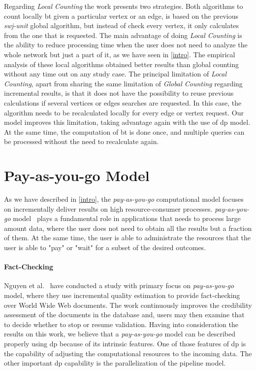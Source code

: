 Regarding \emph{Local Counting} the work presents two strategies. 
Both algorithms to count locally \acrshort{bt} given a particular vertex or an edge, is based on the previous \emph{swj-unit} global algorithm, but instead of check every vertex, it only calculates from the one that is requested. 
The main advantage of doing \emph{Local Counting} is the ability to reduce processing time when the user does not need to analyze the whole network but just a part of it, as we have seen in \autoref{intro}.
The empirical analysis of these local algorithms obtained better results than global counting without any time out on any study case.
The principal limitation of \emph{Local Counting}, apart from sharing the same limitation of \emph{Global Counting} regarding incremental results, is that it does not have the possibility to reuse previous calculations if several vertices or edges searches are requested. 
In this case, the algorithm needs to be recalculated locally for every edge or vertex request.
Our model improves this limitation, taking advantage again with the use of \acrshort{dp} model. At the same time, the computation of \acrshort{bt} is done once, and multiple queries can be processed without the need to recalculate again.

\section{Pay-as-you-go Model}
As we have described in \autoref{intro}, the \emph{pay-as-you-go} computational model focuses on incrementally deliver results on high resource-consumer processes.
\emph{pay-as-you-go} model~\cite{factcatch} plays a fundamental role in applications that needs to process large amount data, where the user does not need to obtain all the results but a fraction of them.
At the same time, the user is able to administrate the resources that the user is able to "pay" or "wait" for a subset of the desired outcomes. 

\paragraph{Fact-Checking} Nguyen et al.~\cite{factcatch} have conducted a study with primary focus on \emph{pay-as-you-go} model, where they use incremental quality estimation to provide fact-checking over World Wide Web documents.
The work continuously improves the credibility assessment of the documents in the database and, users may then examine that to decide whether to stop or resume validation.
Having into consideration the results on this work, we believe that a \emph{pay-as-you-go} model can be described properly using \acrlong{dp} because of its intrinsic features. 
One of those features of \acrshort{dp} is the capability of adjusting the computational resources to the incoming data. The other important \acrshort{dp} capability is the parallelization of the pipeline model.

